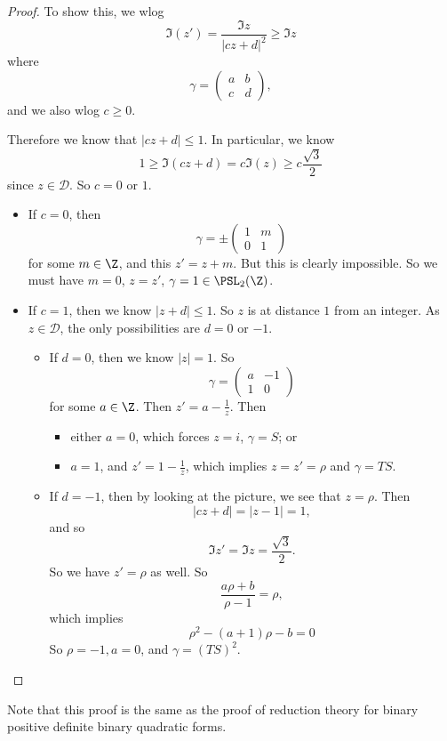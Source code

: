 \documentclass[a4paper]{article}
\begin{document}
\begin{proof}
  To show this, we wlog
  \[
    \Im (z') = \frac{\Im z}{|cz + d|^2} \geq \Im z
  \]
  where
  \[
    \gamma =
    \begin{pmatrix}
      a & b\\
      c & d
    \end{pmatrix},
  \]
  and we also wlog $c \geq 0$.

  Therefore we know that $|cz + d| \leq 1$. In particular, we know
  \[
    1 \geq \Im(cz + d) = c \Im (z) \geq c \frac{\sqrt{3}}{2}
  \]
  since $z \in \mathcal{D}$. So $c = 0$ or $1$.

  \begin{itemize}
    \item If $c = 0$, then
      \[
        \gamma = \pm
        \begin{pmatrix}
          1 & m\\
          0 & 1
        \end{pmatrix}
      \]
      for some $m \in \Z$, and this $z' = z + m$. But this is clearly impossible. So we must have $m = 0$, $z = z'$, $\gamma = 1 \in \PSL_2(\Z)$.

    \item If $c = 1$, then we know $|z + d| \leq 1$. So $z$ is at distance $1$ from an integer. As $z \in \mathcal{D}$, the only possibilities are $d = 0$ or $-1$.

      \begin{itemize}
        \item If $d = 0$, then we know $|z| = 1$. So
          \[
            \gamma =
            \begin{pmatrix}
              a & -1\\
              1 & 0
            \end{pmatrix}
          \]
          for some $a \in \Z$. Then $z' = a - \frac{1}{z}$. Then
          \begin{itemize}
            \item either $a = 0$, which forces $z = i$, $\gamma = S$; or
            \item $a = 1$, and $z' = 1 - \frac{1}{z}$, which implies $z = z' = \rho$ and $\gamma = TS$.
          \end{itemize}
        \item If $d = -1$, then by looking at the picture, we see that $z = \rho$. Then
          \[
            |cz + d| = |z - 1| = 1,
          \]
          and so
          \[
            \Im z' = \Im z = \frac{\sqrt{3}}{2}.
          \]
          So we have $z' = \rho$ as well. So
          \[
            \frac{a \rho + b}{\rho - 1} = \rho,
          \]
          which implies
          \[
            \rho^2 - (a + 1) \rho - b = 0
          \]
          So $\rho = -1, a = 0$, and $\gamma = (TS)^2$.
      \end{itemize}
  \end{itemize}
\end{proof}
Note that this proof is the same as the proof of reduction theory for binary positive definite binary quadratic forms.
\end{document}
